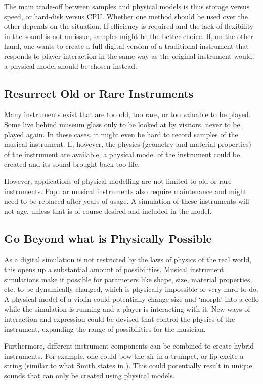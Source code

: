 The main trade-off between samples and physical models is thus storage versus speed, or hard-disk versus CPU. Whether one method should be used over the other depends on the situation. If efficiency is required and the lack of flexibility in the sound is not an issue, samples might be the better choice. If, on the other hand, one wants to create a full digital version of a traditional instrument that responds to player-interaction in the same way as the original instrument would, a physical model should be chosen instead.

\subsection{Resurrect Old or Rare Instruments}
Many instruments exist that are too old, too rare, or too valuable to be played. Some live behind museum glass only to be looked at by visitors, never to be played again. In these cases, it might even be hard to record samples of the musical instrument. If, however, the physics (geometry and material properties) of the instrument are available, a physical model of the instrument could be created and its sound brought back too life.

However, applications of physical modelling are not limited to old or rare instruments. Popular musical instruments also require maintenance and might need to be replaced after years of usage. A simulation of these instruments will not age, unless that is of course desired and included in the model.

\subsection{Go Beyond what is Physically Possible}\label{sec:impossible}
As a digital simulation is not restricted by the laws of physics of the real world, this opens up a substantial amount of possibilities.
Musical instrument simulations make it possible for parameters like shape, size, material properties, etc. to be dynamically changed, which is physically impossible or very hard to do. A physical model of a violin could potentially change size and `morph' into a cello while the simulation is running and a player is interacting with it. New ways of interaction and expression could be devised that control the physics of the instrument, expanding the range of possibilities for the musician. 

Furthermore, different instrument components can be combined to create hybrid instruments. For example, one could bow the air in a trumpet, or lip-excite a string (similar to what Smith states in \cite{Smith2010a}). This could potentially result in unique sounds that can only be created using physical models.

